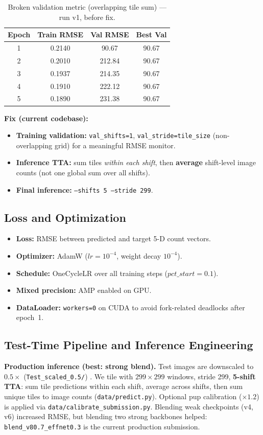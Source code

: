 \documentclass[12pt, a4paper]{article}
\begin{document}
\begin{table}[htbp]
\centering
\caption{Broken validation metric (overlapping tile sum) --- run v1, before fix.}
\label{tab:broken_val}
\begin{tabular}{@{}cccc@{}}
\toprule
\textbf{Epoch} & \textbf{Train RMSE} & \textbf{Val RMSE} & \textbf{Best Val} \\ \midrule
1 & 0.2140 & 90.67 & 90.67 \\
2 & 0.2010 & 212.84 & 90.67 \\
3 & 0.1937 & 214.35 & 90.67 \\
4 & 0.1910 & 222.12 & 90.67 \\
5 & 0.1890 & 231.38 & 90.67 \\ \bottomrule
\end{tabular}
\end{table}

\textbf{Fix (current codebase):}
\begin{itemize}
    \item \textbf{Training validation:} \texttt{val\_shifts=1}, \texttt{val\_stride=tile\_size} (non-overlapping grid) for a meaningful RMSE monitor.
    \item \textbf{Inference TTA:} sum tiles \emph{within each shift}, then \textbf{average} shift-level image counts (not one global sum over all shifts).
    \item \textbf{Final inference:} \texttt{--shifts 5 --stride 299}.
\end{itemize}

\subsection{Loss and Optimization}
\begin{itemize}
    \item \textbf{Loss:} RMSE between predicted and target 5-D count vectors.
    \item \textbf{Optimizer:} AdamW ($lr = 10^{-4}$, weight decay $10^{-4}$).
    \item \textbf{Schedule:} OneCycleLR over all training steps ($pct\_start = 0.1$).
    \item \textbf{Mixed precision:} AMP enabled on GPU.
    \item \textbf{DataLoader:} \texttt{workers=0} on CUDA to avoid fork-related deadlocks after epoch~1.
\end{itemize}

\subsection{Test-Time Pipeline and Inference Engineering}
\textbf{Production inference (best: strong blend).} Test images are downscaled to $0.5\times$ (\texttt{Test\_scaled\_0.5/}) \cite{asanakoy2017}. We tile with $299\times299$ windows, stride 299, \textbf{5-shift TTA}: sum tile predictions within each shift, average across shifts, then sum unique tiles to image counts (\texttt{data/predict.py}). Optional pup calibration ($\times 1.2$) is applied via \texttt{data/calibrate\_submission.py}. Blending weak checkpoints (v4, v6) increased RMSE, but blending two strong backbones helped: \texttt{blend\_v80.7\_effnet0.3} is the current production submission.
\end{document}
